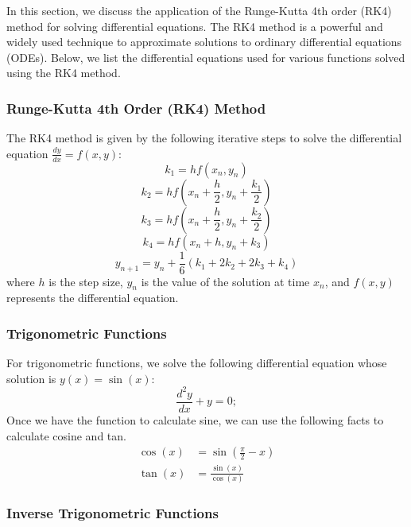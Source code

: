 \documentclass[a4paper,12pt]{article}
\begin{document}
In this section, we discuss the application of the Runge-Kutta 4th order (RK4) method for solving differential equations. The RK4 method is a powerful and widely used technique to approximate solutions to ordinary differential equations (ODEs). Below, we list the differential equations used for various functions solved using the RK4 method.

\subsubsection*{Runge-Kutta 4th Order (RK4) Method}

The RK4 method is given by the following iterative steps to solve the differential equation \( \frac{dy}{dx} = f(x, y) \):
\[
k_1 = h f(x_n, y_n)
\]
\[
k_2 = h f\left( x_n + \frac{h}{2}, y_n + \frac{k_1}{2} \right)
\]
\[
k_3 = h f\left( x_n + \frac{h}{2}, y_n + \frac{k_2}{2} \right)
\]
\[
k_4 = h f(x_n + h, y_n + k_3)
\]
\[
y_{n+1} = y_n + \frac{1}{6} \left( k_1 + 2k_2 + 2k_3 + k_4 \right)
\]
where \( h \) is the step size, \( y_n \) is the value of the solution at time \( x_n \), and \( f(x, y) \) represents the differential equation.

\subsubsection*{Trigonometric Functions}

For trigonometric functions, we solve the following differential equation whose solution is \( y(x) = \sin(x) \):
\[
\frac{d^2y}{dx} + y = 0;
\]
 Once we have the function to calculate sine, we can use the following facts to calculate cosine and tan. 
\begin{align*} 
 \cos(x) &= \sin \left( \frac{\pi}{2} - x \right)\\ 
 \tan(x) &= \frac{\sin(x)}{\cos(x)}
\end{align*}

\subsubsection*{Inverse Trigonometric Functions}
\end{document}
